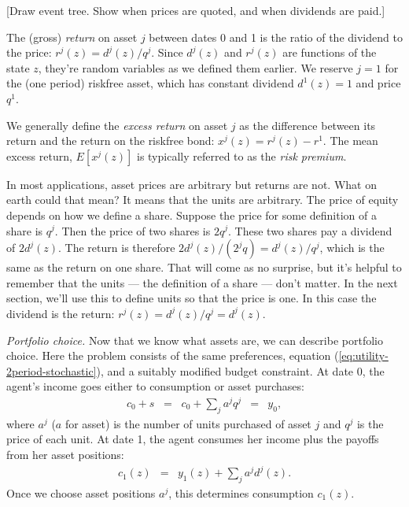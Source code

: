 \documentclass[11pt]{article}
\begin{document}
[Draw event tree. Show when prices are quoted, and when dividends are paid.]

The (gross) {\it return\/} on asset $j$ between dates 0 and 1
is the ratio of the dividend to the price: $r^j(z) = d^j(z)/q^j$.
Since $d^j(z)$ and $r^j(z)$ are functions of the state $z$,
they're random variables as we defined them earlier.
We reserve $j=1$ for the (one period) riskfree asset,
which has constant dividend $d^1(z) = 1$ and price $q^1$.

We generally define the {\it excess return\/} on asset $j$ as the difference
between its return and the return on the riskfree bond:
$ x^j(z) = r^j(z) - r^1 $.
The mean excess return, $ E[x^j(z)]$ is typically referred
to as the {\it risk premium\/}.


In most applications, asset prices are arbitrary but returns are not.
What on earth could that mean?
It means that the units are arbitrary.
The price of equity depends on how we define a share.
Suppose the price for some definition of a share is $q^j$.
Then the price of two shares is $2q^j$.
These two shares pay a dividend of $2 d^j(z)$.
The return is therefore $ 2d^j(z)/(2^jq) = d^j(z)/q^j$,
which is the same as the return on one share.
That will come as no surprise, but it's helpful to remember
that the units --- the definition of a share --- don't matter.
In the next section, we'll use this to define
units so that the price is one.
In this case the dividend is the return:  $r^j(z) = d^j(z)/q^j = d^j(z)$.

{\it Portfolio choice.\/}
Now that we know what assets are, we can describe portfolio choice.
Here the problem consists of the same preferences,
equation (\ref{eq:utility-2period-stochastic}),
and a suitably modified budget constraint.
At date 0, the agent's income goes either to consumption
or asset purchases:
\begin{eqnarray}
    c_0 + s \;\;=\;\; c_0 + \sum_j a^j q^j &=& y_0 ,
    \label{eq:budget-2period-c0}
\end{eqnarray}
where $a^j$ ($a$ for asset) is the number of units
purchased of asset $j$ and $q^j$ is the price of each unit.
At date 1, the agent consumes her income
plus the payoffs from her asset positions:
\begin{eqnarray}
    c_1(z)  &=& y_1(z) + \sum_j a^j d^j(z) .
    \label{eq:budget-2period-c1}
\end{eqnarray}
Once we choose asset positions $a^j$,
this determines consumption $c_1(z)$.
\end{document}
